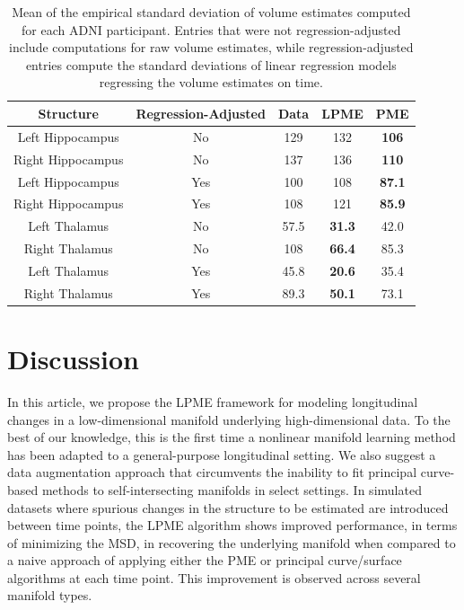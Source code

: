 \documentclass[11pt,reqno]{article}
\theoremstyle{definition}
\begin{document}
\begin{table}[ht]
  \centering
  \begin{tabular}{|c c c c c|}
    \hline
    Structure & Regression-Adjusted & Data & LPME & PME  \\
    \hline
    Left Hippocampus & No & 129 & 132 & \textbf{106} \\
    Right Hippocampus & No & 137 & 136 & \textbf{110} \\
    Left Hippocampus & Yes & 100 & 108 & \textbf{87.1} \\
    Right Hippocampus & Yes & 108 & 121 & \textbf{85.9} \\
    Left Thalamus & No & 57.5 & \textbf{31.3} & 42.0 \\
    Right Thalamus & No & 108 & \textbf{66.4} & 85.3 \\
    Left Thalamus & Yes & 45.8 & \textbf{20.6} & 35.4 \\
    Right Thalamus & Yes & 89.3 & \textbf{50.1} & 73.1 \\
    \hline
  \end{tabular}
  \caption{Mean of the empirical standard deviation of volume estimates computed for each ADNI participant. Entries that were not regression-adjusted include computations for raw volume estimates, while regression-adjusted entries compute the standard deviations of linear regression models regressing the volume estimates on time. }
  \label{table:adni_volume_sds}
\end{table}



\section{Discussion}\label{s:discussion}

In this article, we propose the LPME framework for modeling longitudinal changes in a low-dimensional manifold underlying high-dimensional data. To the best of our knowledge, this is the first time a nonlinear manifold learning method has been adapted to a general-purpose longitudinal setting. We also suggest a data augmentation approach that circumvents the inability to fit principal curve-based methods to self-intersecting manifolds in select settings. In simulated datasets where spurious changes in the structure to be estimated are introduced between time points, the LPME algorithm shows improved performance, in terms of minimizing the MSD, in recovering the underlying manifold when compared to a naive approach of applying either the PME or principal curve/surface algorithms at each time point. This improvement is observed across several manifold types.
\end{document}
